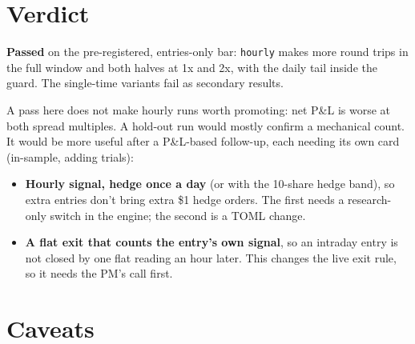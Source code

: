 \documentclass{article}
\begin{document}
\section{Verdict}

\textbf{Passed} on the pre-registered, entries-only bar: \texttt{hourly} makes more round trips in the full window and both halves at 1x and 2x, with the daily tail inside the guard. The single-time variants fail as secondary results.

A pass here does not make hourly runs worth promoting: net P\&L is worse at both spread multiples. A hold-out run would mostly confirm a mechanical count. It would be more useful after a P\&L-based follow-up, each needing its own card (in-sample, adding trials):

\begin{itemize}

\item \textbf{Hourly signal, hedge once a day} (or with the 10-share hedge band), so extra entries don't bring extra \$1 hedge orders. The first needs a research-only switch in the engine; the second is a TOML change.

\item \textbf{A flat exit that counts the entry's own signal}, so an intraday entry is not closed by one flat reading an hour later. This changes the live exit rule, so it needs the PM's call first.

\end{itemize}

\section{Caveats}
\end{document}
